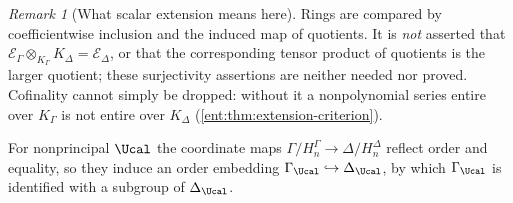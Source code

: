 \documentclass[11pt]{article}
\theoremstyle{plain}
\theoremstyle{plain}
\theoremstyle{plain}
\theoremstyle{definition}
\theoremstyle{definition}
\theoremstyle{definition}
\theoremstyle{definition}
\theoremstyle{remark}
\newtheorem{remark}[remark]{Remark}
\begin{document}
\begin{remark}[What scalar extension means here]
Rings are compared by coefficientwise inclusion and the induced map of
quotients. It is \emph{not} asserted that
$\mathcal E_\Gamma\otimes_{K_\Gamma}K_\Delta=\mathcal E_\Delta$, or that the
corresponding tensor product of quotients is the larger quotient; these
surjectivity assertions are neither needed nor proved. Cofinality cannot
simply be dropped: without it a nonpolynomial series entire over $K_\Gamma$
is not entire over $K_\Delta$ (\cref{ent:thm:extension-criterion}).
\end{remark}

For nonprincipal $\Ucal$ the coordinate maps
$\Gamma/H_n^\Gamma\to\Delta/H_n^\Delta$ reflect order and equality, so they
induce an order embedding $\Gamma_\Ucal\hookrightarrow\Delta_\Ucal$,
by which $\Gamma_\Ucal$ is identified with a subgroup of $\Delta_\Ucal$.
\end{document}
